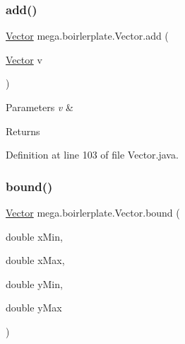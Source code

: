 \mbox{\label{classmega_1_1boirlerplate_1_1_vector_a7bb9313fc1427da0544c4827d58a6d94}} 
\subsubsection{\texorpdfstring{add()}{add()}\hspace{0.1cm}{\footnotesize\ttfamily [2/2]}}
{\footnotesize\ttfamily \hyperlink{classmega_1_1boirlerplate_1_1_vector}{Vector} mega.\+boirlerplate.\+Vector.\+add (\begin{DoxyParamCaption}\item[{\hyperlink{classmega_1_1boirlerplate_1_1_vector}{Vector}}]{v }\end{DoxyParamCaption})}


\begin{DoxyParams}{Parameters}
{\em v} & \\
\hline
\end{DoxyParams}
\begin{DoxyReturn}{Returns}

\end{DoxyReturn}


Definition at line 103 of file Vector.\+java.

\mbox{\label{classmega_1_1boirlerplate_1_1_vector_aa0e82d91a3e8435232a579a05652ddb1}} 
\subsubsection{\texorpdfstring{bound()}{bound()}}
{\footnotesize\ttfamily \hyperlink{classmega_1_1boirlerplate_1_1_vector}{Vector} mega.\+boirlerplate.\+Vector.\+bound (\begin{DoxyParamCaption}\item[{double}]{x\+Min,  }\item[{double}]{x\+Max,  }\item[{double}]{y\+Min,  }\item[{double}]{y\+Max }\end{DoxyParamCaption})}



